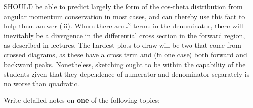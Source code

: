 \documentclass[txfonts]{NSTexam}
\begin{document}
\begin{questions}
SHOULD be able to predict largely the form of the cos-theta distribution from angular momentum conservation in most cases, and can thereby use this fact to help them answer (iii).  Where there are $t^2$ terms in the denominator, there will inevitably be a divergence in the differential cross section in the forward region, as described in lectures.  The hardest plots to draw will be two that come from crossed diagrams, as these have a cross term and (in one case) both forward and
backward peaks.  Nonetheless, sketching ought to be within the capability of the students given that they dependence of numerator and denominator separately is no worse than quadratic.
\endanswer


\vspace{1cm}
\question 
Write detailed notes on {\bf one} of the following topics:

\answer

\begin{parts}

\end{parts}
\end{questions}
\end{document}

